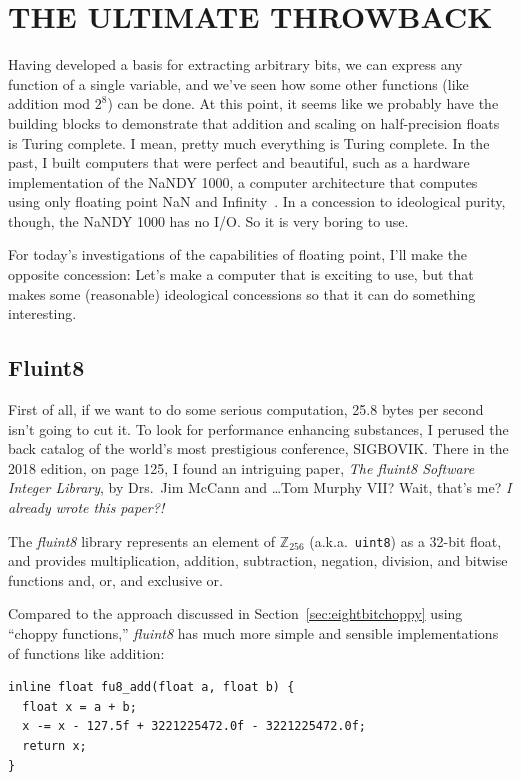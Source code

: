 \documentclass[twocolumn]{article}
\begin{document}
\section{THE ULTIMATE THROWBACK}
Having developed a basis for extracting arbitrary bits, we can express
any function of a single variable, and we've seen how some other
functions (like addition mod $2^8$) can be done. At this point, it
seems like we probably have the building blocks to demonstrate that
addition and scaling on half-precision floats is Turing complete. I
mean, pretty much everything is Turing complete. In the past, I built
computers that were perfect and beautiful, such as a hardware
implementation of the NaNDY 1000, a computer architecture that
computes using only floating point NaN and
Infinity~\cite{murphy2019nan}. In a concession to ideological purity,
though, the NaNDY 1000 has no I/O. So it is very boring to use.

For today's investigations of the capabilities of floating point, I'll
make the opposite concession: Let's make a computer that is exciting
to use, but that makes some (reasonable) ideological concessions so that
it can do something interesting.

\subsection{Fluint8} \label{sec:fluint}

First of all, if we want to do some serious computation, 25.8 bytes
per second isn't going to cut it. To look for performance enhancing
substances, I perused the back catalog of the world's most prestigious
conference, SIGBOVIK. There in the 2018 edition, on page 125, I found
an intriguing paper, {\it The fluint8 Software Integer Library}, by
Drs.~Jim McCann and \ldots Tom Murphy VII? Wait, that's me? {\large \em I already
wrote this paper?!}

\medskip
The {\it fluint8} library represents an element of $\mathbb{Z}_{256}$
(a.k.a.~{\tt uint8}) as a 32-bit float, and provides multiplication,
addition, subtraction, negation, division, and bitwise functions and,
or, and exclusive or.

Compared to the approach discussed in Section~\ref{sec:eightbitchoppy}
using ``choppy functions,'' {\it fluint8} has much more simple and
sensible implementations of functions like addition:

\begin{lstlisting}
inline float fu8_add(float a, float b) {
  float x = a + b;
  x -= x - 127.5f + 3221225472.0f - 3221225472.0f;
  return x;
}
\end{lstlisting}
\end{document}
